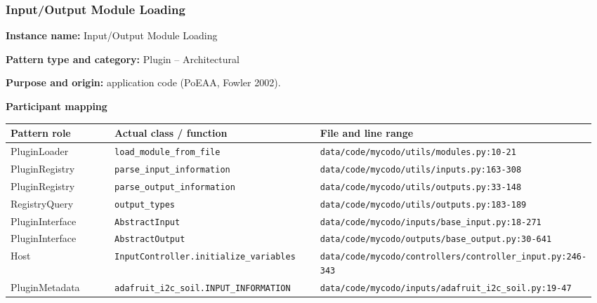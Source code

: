 \documentclass[11pt,a4paper]{article}
\newcommand{\field}[2]{\textbf{#1:} #2\par}
\begin{document}
\subsubsection{Input/Output Module Loading}
\field{Instance name}{Input/Output Module Loading}
\field{Pattern type and category}{Plugin -- Architectural}
\field{Purpose and origin}{application code (PoEAA, Fowler 2002).}
\textbf{Participant mapping}\par
{\small\setlength{\tabcolsep}{3pt}
\begin{longtable}{@{}P{0.21\linewidth}P{0.37\linewidth}P{0.39\linewidth}@{}}\toprule
\textbf{Pattern role} & \textbf{Actual class / function} & \textbf{File and line range} \\ \midrule\endhead
PluginLoader & \texttt{load\_\allowbreak{}module\_\allowbreak{}from\_\allowbreak{}file} & \texttt{data/\allowbreak{}code/\allowbreak{}mycodo/\allowbreak{}utils/\allowbreak{}modules.\allowbreak{}py:10-21} \\
PluginRegistry & \texttt{parse\_\allowbreak{}input\_\allowbreak{}information} & \texttt{data/\allowbreak{}code/\allowbreak{}mycodo/\allowbreak{}utils/\allowbreak{}inputs.\allowbreak{}py:163-308} \\
PluginRegistry & \texttt{parse\_\allowbreak{}output\_\allowbreak{}information} & \texttt{data/\allowbreak{}code/\allowbreak{}mycodo/\allowbreak{}utils/\allowbreak{}outputs.\allowbreak{}py:33-148} \\
RegistryQuery & \texttt{output\_\allowbreak{}types} & \texttt{data/\allowbreak{}code/\allowbreak{}mycodo/\allowbreak{}utils/\allowbreak{}outputs.\allowbreak{}py:183-189} \\
PluginInterface & \texttt{AbstractInput} & \texttt{data/\allowbreak{}code/\allowbreak{}mycodo/\allowbreak{}inputs/\allowbreak{}base\_\allowbreak{}input.\allowbreak{}py:18-271} \\
PluginInterface & \texttt{AbstractOutput} & \texttt{data/\allowbreak{}code/\allowbreak{}mycodo/\allowbreak{}outputs/\allowbreak{}base\_\allowbreak{}output.\allowbreak{}py:30-641} \\
Host & \texttt{InputController.\allowbreak{}initialize\_\allowbreak{}variables} & \texttt{data/\allowbreak{}code/\allowbreak{}mycodo/\allowbreak{}controllers/\allowbreak{}controller\_\allowbreak{}input.\allowbreak{}py:246-343} \\
PluginMetadata & \texttt{adafruit\_\allowbreak{}i2c\_\allowbreak{}soil.\allowbreak{}INPUT\_\allowbreak{}INFORMATION} & \texttt{data/\allowbreak{}code/\allowbreak{}mycodo/\allowbreak{}inputs/\allowbreak{}adafruit\_\allowbreak{}i2c\_\allowbreak{}soil.\allowbreak{}py:19-47} \\

\end{longtable}}
\end{document}
